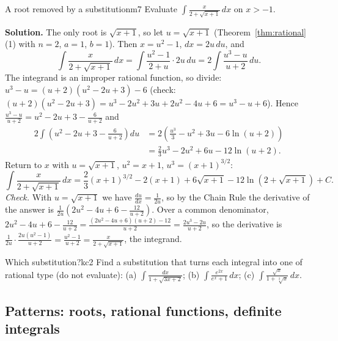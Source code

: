 \documentclass[11pt]{article}
\begin{document}
\begin{exmp}{A root removed by a substitution}{m7}
Evaluate $\displaystyle\int\frac{x}{2+\sqrt{x+1}}\,dx$ on $x>-1$.

\textbf{Solution.} The only root is $\sqrt{x+1}$, so let $u=\sqrt{x+1}$ (Theorem~\ref{thm:rational}(1) with $n=2$, $a=1$, $b=1$). Then $x=u^2-1$, $dx=2u\,du$, and
\[\int\frac{x}{2+\sqrt{x+1}}\,dx=\int\frac{u^2-1}{2+u}\cdot2u\,du=2\int\frac{u^3-u}{u+2}\,du .\]
The integrand is an improper rational function, so divide: $u^3-u=(u+2)(u^2-2u+3)-6$ (check: $(u+2)(u^2-2u+3)=u^3-2u^2+3u+2u^2-4u+6=u^3-u+6$). Hence $\frac{u^3-u}{u+2}=u^2-2u+3-\frac6{u+2}$ and
\begin{align*}2\int\left(u^2-2u+3-\frac6{u+2}\right)du&=2\left(\frac{u^3}3-u^2+3u-6\ln(u+2)\right)\\&=\frac23u^3-2u^2+6u-12\ln(u+2).\end{align*}
Return to $x$ with $u=\sqrt{x+1}$, $u^2=x+1$, $u^3=(x+1)^{3/2}$:
\[\int\frac{x}{2+\sqrt{x+1}}\,dx=\frac23(x+1)^{3/2}-2(x+1)+6\sqrt{x+1}-12\ln\left(2+\sqrt{x+1}\right)+C .\]
\emph{Check.} With $u=\sqrt{x+1}$ we have $\frac{du}{dx}=\frac1{2u}$, so by the Chain Rule the derivative of the answer is $\frac1{2u}\left(2u^2-4u+6-\frac{12}{u+2}\right)$. Over a common denominator, $2u^2-4u+6-\frac{12}{u+2}=\frac{(2u^2-4u+6)(u+2)-12}{u+2}=\frac{2u^3-2u}{u+2}$, so the derivative is $\frac1{2u}\cdot\frac{2u(u^2-1)}{u+2}=\frac{u^2-1}{u+2}=\frac{x}{2+\sqrt{x+1}}$, the integrand.
\end{exmp}

\begin{kc}{Which substitution?}{kc2}
Find a substitution that turns each integral into one of rational type (do not evaluate): (a) $\displaystyle\int\frac{dx}{1+\sqrt{3x+2}}$; (b) $\displaystyle\int\frac{e^{2x}}{e^x+1}\,dx$; (c) $\displaystyle\int\frac{\sqrt x}{1+\sqrt[3]x}\,dx$.
\end{kc}

\subsection*{Patterns: roots, rational functions, definite integrals}
\end{document}
